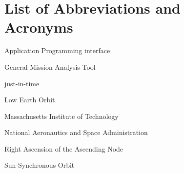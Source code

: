 \chapter{List of Abbreviations and Acronyms}

 
\begin{description}[leftmargin=*, widest=DCCHTM]
    
    \item[API]
    Application Programming interface

    \item[GMAT]
    General Mission Analysis Tool

    \item[JIT]
    just-in-time

    \item[LEO]
    Low Earth Orbit

    \item[MIT]
    Massachusetts Institute of Technology 

    \item[NASA]
    National Aeronautics and Space Administration

    \item[RAAN]
    Right Ascension of the Ascending Node

    \item[SSO]
    Sun-Synchronous Orbit
    
    
    
\end{description}
